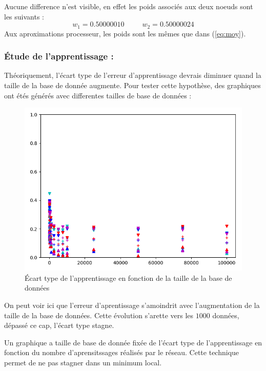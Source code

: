 Aucune difference n'est visible, en effet les poids associés aux deux noeuds sont les suivants :
\begin{equation*}
    w_1 = 0.50000010
    \;\;\;\;\;\;\;\;\;
    w_2 = 0.50000024
\end{equation*}
Aux aproximations processeur, les poids sont les mêmes que dans (\ref{eq:moy}).


\subsubsection{Étude de l'apprentissage :}\label{subsec:app}
Théoriquement, l'écart type de l'erreur d'apprentissage devrais
diminuer quand la taille de la base de donnée augmente.
Pour tester cette hypothèse, des graphiques ont étés générés avec
differentes tailles de base de données :

\begin{figure}[H]
    \center
    \includegraphics[height=\moyen]{pict/appfd.png}
	\caption{Écart type de l'apprentissage en fonction de la taille de la base de données}
	\label{fig:etfdata2graph}
\end{figure}
\vspace{-5pt}
On peut voir ici que l'erreur d'aprentissage s'amoindrit avec l'augmentation de la taille de la base de données.
Cette évolution s'arette vers les $1000$ données, dépassé ce cap, l'écart type stagne.


Un graphique a taille de base de donnée fixée de l'écart type de l'apprentissage
en fonction du nombre d'aprensitssages réalisés par le réseau.
Cette technique permet de ne pas stagner dans un minimum local.

